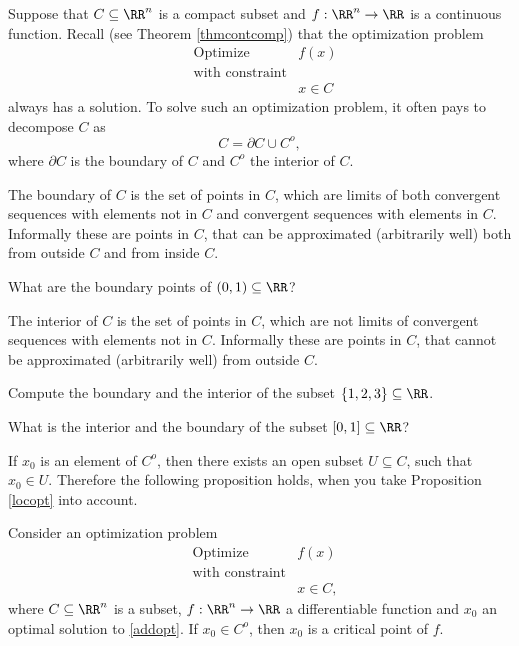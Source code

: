 \documentclass{article}
\begin{document}
Suppose that $C\subseteq \RR^n$ is a compact subset and $f:\RR^n\rightarrow \RR$ is a
continuous function. Recall (see Theorem \ref{thmcontcomp}) that the
optimization problem
  \begin{align*}
    &\text{Optimize} &f(x)\\
    &\text{with constraint}\\
    &&x\in C
  \end{align*}
  always has a solution. To solve such an optimization problem, it often
  pays to decompose $C$ as
  $$
  C = \partial C \cup C^o,
  $$
  where $\partial C$ is the boundary of $C$ and $C^o$ the interior of $C$.

  The boundary of $C$ is the set of points in $C$, which are limits of both
  convergent sequences with elements not in $C$ and convergent sequences with elements in $C$.
Informally these are points in $C$,
  that can be approximated (arbitrarily well) both from outside $C$ and from inside $C$.

\beginshex
What are the boundary points of $(0, 1)\subseteq \RR$?
\endshex  


  The interior of $C$ is the set of points in $C$, which are
  not limits of convergent sequences with elements not in $C$. Informally these are points in $C$,
  that cannot be approximated (arbitrarily well) from outside $C$.

  \beginshex
  Compute the boundary and the interior of the subset $\{1, 2, 3\}\subseteq \RR$.
  
  What is the interior and the boundary of the subset $[0, 1] \subseteq \RR$?
  \endshex

  If $x_0$ is an element of $C^o$, then there exists an open subset
  $U\subseteq C$, such that $x_0\in U$. Therefore the following proposition holds, when you take Proposition \ref{locopt} into account.

  \begin{proposition}[emph]\label{propint}
    Consider an optimization problem
  \begin{align}\label{addopt}
    &\text{Optimize} &f(x)\\
    &\text{with constraint}\\
    &&x\in C,
  \end{align}
  where $C\subseteq \RR^n$ is a subset, $f:\RR^n\rightarrow \RR$ a
  differentiable function and $x_0$ an optimal solution to \eqref{addopt}. If $x_0\in C^o$, then $x_0$ is a critical point of $f$.
\end{proposition}
\end{document}
